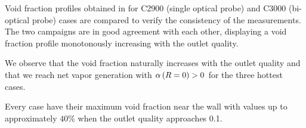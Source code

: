 Void fraction profiles obtained in for C2900 (single optical probe) and C3000 (bi-optical probe) cases are compared to verify the consistency of the measurements. The two campaigns are in good agreement with each other, displaying a void fraction profile monotonously increasing with the outlet quality.  

We observe that the void fraction naturally increases with the outlet quality and that we reach net vapor generation with $\alpha\left( R=0 \right) > 0$ for the three hottest cases.

Every case have their maximum void fraction near the wall with values up to approximately $40\%$ when the outlet quality approaches 0.1.

\begin{figure}[h!]
\centering

\\
\end{figure}
